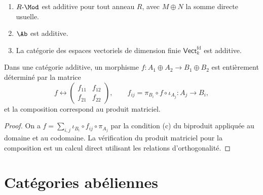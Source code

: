 \begin{exemple}\label{ex:additive-cats}
\begin{enumerate}[label=(\roman*)]
\item $R\text{-}\Mod$ est additive pour tout anneau $R$, avec
  $M \oplus N$ la somme directe usuelle.
\item $\Ab$ est additive.
\item La catégorie des espaces vectoriels de dimension finie
  $\mathsf{Vect}_k^{\mathrm{fd}}$
  est additive.
\end{enumerate}
\end{exemple}

\begin{proposition}\label{prop:matrix-morphisms}
Dans une catégorie additive, un morphisme
$f \colon A_1 \oplus A_2 \to B_1 \oplus B_2$ est entièrement déterminé
par la matrice
\[
  f \longleftrightarrow
  \begin{pmatrix} f_{11} & f_{12} \\ f_{21} & f_{22} \end{pmatrix},
  \qquad f_{ij} = \pi_{B_i} \circ f \circ \iota_{A_j}
  \colon A_j \to B_i,
\]
et la composition correspond au produit matriciel.
\end{proposition}

\begin{proof}
On a $f = \sum_{i,j} \iota_{B_i} \circ f_{ij} \circ \pi_{A_j}$
par la condition (c) du biproduit appliquée au domaine et au codomaine.
La vérification du produit matriciel pour la composition est un calcul
direct utilisant les relations d'orthogonalité.
\end{proof}


\section{Catégories abéliennes}\label{sec:abelian}


